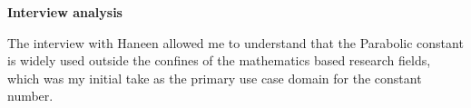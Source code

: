 \begin{enumerate}
\begin{flushleft}
\textbf{Interview analysis}

The interview with Haneen allowed me to understand that the Parabolic constant is widely used outside the confines of the mathematics based research fields, which was my initial take as the primary use case domain for the constant number. 
    
    
    

\end{flushleft}





\end{enumerate}

